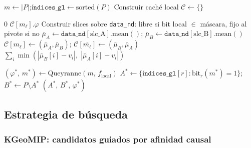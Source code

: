 \begin{algorithm}[H]
\caption{QNodesBloque — bipartición de un bloque con oracle local}
\label{alg:qnodes_bloque}
\begin{algorithmic}[1]
\State $m \leftarrow |P|$;\quad $\texttt{índices\_gl} \leftarrow \text{sorted}(P)$
\State Construir caché local $\mathcal{C} \leftarrow \{\}$ 

   \Return $0$ \EndIf
   \Return $\mathcal{C}[m_{\ell}].\varphi$ \EndIf
  \State Construir slices sobre \texttt{data\_nd}: libre si bit local $\in$ máscara, fijo al pivote si no
  \State $\bar{\mu}_A \leftarrow \texttt{data\_nd}[\text{slc\_A}].\text{mean}()$;\quad
         $\bar{\mu}_B \leftarrow \texttt{data\_nd}[\text{slc\_B}].\text{mean}()$
  \State $\mathcal{C}[m_{\ell}] \leftarrow (\bar{\mu}_A, \bar{\mu}_B)$;\quad
         $\mathcal{C}[\overline{m_{\ell}}] \leftarrow (\bar{\mu}_B, \bar{\mu}_A)$
  \State \Return $\sum_i \min(|\bar{\mu}_B[i] - v_i|,\; |\bar{\mu}_A[i] - v_i|)$
\EndFunction

\State $(\varphi^*,\, m^*) \leftarrow \text{Queyranne}(m,\, f_{\text{local}})$
\State $A^* \leftarrow \{\texttt{índices\_gl}[r] : \text{bit}_r(m^*) = 1\}$;\quad
       $B^* \leftarrow P \setminus A^*$
\State \Return $(A^*,\, B^*,\, \varphi^*)$
\end{algorithmic}
\end{algorithm}

\subsection{Estrategia de búsqueda}

\subsubsection*{KGeoMIP: candidatos guiados por afinidad causal}


